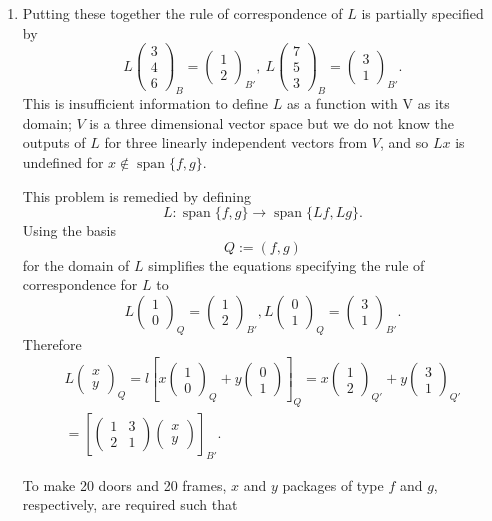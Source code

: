 \documentclass[12pt]{article}
\def\ba{\left(\begin{array}{cc}}
\def\ea{\end{array}\right) }
\def\bv{\left(\begin{array}{c}}
\def\ev{\end{array}\right) }
\def\span{ \operatorname{span}}
\begin{document}
\begin{enumerate}
\begin{enumerate}
\item 
Putting these together the rule of correspondence of $L$ is partially specified by
\[ L\bv 3\\4\\6 \ev_B=\bv 1\\2\ev _{B'} , ~L\bv 7\\5\\3 \ev_B=\bv3\\1 \ev _{B'}.\]
This is insufficient information to define $L$ as a function with V as its domain; $V$ is a three dimensional vector space but we do not know the outputs of $L$ for three linearly independent vectors from $V$, 
and so $Lx$ is undefined for $x\notin \span\{ f,g\}$. 

This  problem is remedied by defining 
\[L: \span \{ f,g \} \to  \span\{Lf,Lg\} .\] 
Using the basis 
\[ Q:=(f,g)\] 
for  the domain of $L$ simplifies the equations specifying the rule of correspondence for $L$ to 
\[L \bv 1\\0 \ev_Q = \bv 1\\2 \ev_{B'}, L\bv 0\\1 \ev_Q = \bv 3\\1 \ev_{B'}.\]
Therefore
\begin{gather*}L\bv x\\y \ev_Q= l \left[   x \bv 1\\0 \ev_Q+y \bv 0\\1 \ev \right]_{Q}
=x\bv 1\\2 \ev_{Q'} +y \bv 3\\1 \ev_{Q'}\\
= 
\left[       \ba 1&3\\2&1\ea \bv x\\y \ev 
\right]_{B'}.\end{gather*}

To make 20 doors and 20 frames, $x$ and $y$ packages of type $f$ and $g$, respectively, are required such that 


\end{enumerate}
\end{enumerate}
\end{document}
